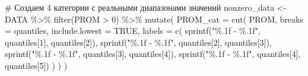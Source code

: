 \documentclass[
  letterpaper,
  DIV=11,
  numbers=noendperiod]{scrreprt}
\newenvironment{Shaded}{\begin{snugshade}}{\end{snugshade}}
\newcommand{\AttributeTok}[1]{\textcolor[rgb]{0.40,0.45,0.13}{#1}}
\newcommand{\CommentTok}[1]{\textcolor[rgb]{0.37,0.37,0.37}{#1}}
\newcommand{\ConstantTok}[1]{\textcolor[rgb]{0.56,0.35,0.01}{#1}}
\newcommand{\DecValTok}[1]{\textcolor[rgb]{0.68,0.00,0.00}{#1}}
\newcommand{\FunctionTok}[1]{\textcolor[rgb]{0.28,0.35,0.67}{#1}}
\newcommand{\NormalTok}[1]{\textcolor[rgb]{0.00,0.23,0.31}{#1}}
\newcommand{\OtherTok}[1]{\textcolor[rgb]{0.00,0.23,0.31}{#1}}
\newcommand{\SpecialCharTok}[1]{\textcolor[rgb]{0.37,0.37,0.37}{#1}}
\newcommand{\StringTok}[1]{\textcolor[rgb]{0.13,0.47,0.30}{#1}}
\begin{document}
\begin{Shaded}
\begin{Highlighting}[]
\CommentTok{\# Создаем 4 категории с реальными диапазонами значений}
\NormalTok{nonzero\_data }\OtherTok{\textless{}{-}}\NormalTok{ DATA }\SpecialCharTok{\%\textgreater{}\%} 
  \FunctionTok{filter}\NormalTok{(PROM }\SpecialCharTok{\textgreater{}} \DecValTok{0}\NormalTok{) }\SpecialCharTok{\%\textgreater{}\%}
  \FunctionTok{mutate}\NormalTok{(}
    \AttributeTok{PROM\_cat =} \FunctionTok{cut}\NormalTok{(}
\NormalTok{      PROM,}
      \AttributeTok{breaks =}\NormalTok{ quantiles,}
      \AttributeTok{include.lowest =} \ConstantTok{TRUE}\NormalTok{,}
      \AttributeTok{labels =} \FunctionTok{c}\NormalTok{(}
        \FunctionTok{sprintf}\NormalTok{(}\StringTok{"\%.1f {-} \%.1f"}\NormalTok{, quantiles[}\DecValTok{1}\NormalTok{], quantiles[}\DecValTok{2}\NormalTok{]),}
        \FunctionTok{sprintf}\NormalTok{(}\StringTok{"\%.1f {-} \%.1f"}\NormalTok{, quantiles[}\DecValTok{2}\NormalTok{], quantiles[}\DecValTok{3}\NormalTok{]),}
        \FunctionTok{sprintf}\NormalTok{(}\StringTok{"\%.1f {-} \%.1f"}\NormalTok{, quantiles[}\DecValTok{3}\NormalTok{], quantiles[}\DecValTok{4}\NormalTok{]),}
        \FunctionTok{sprintf}\NormalTok{(}\StringTok{"\%.1f {-} \%.1f"}\NormalTok{, quantiles[}\DecValTok{4}\NormalTok{], quantiles[}\DecValTok{5}\NormalTok{])}
\NormalTok{      )}
\NormalTok{    )}
\NormalTok{  )}


\end{Highlighting}
\end{Shaded}
\end{document}
